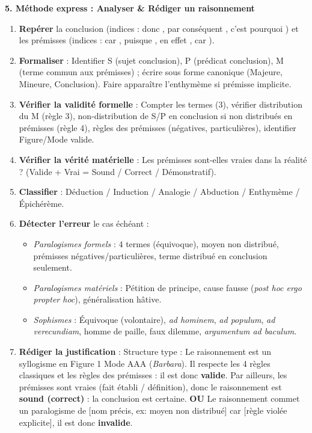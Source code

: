 \documentclass[11pt]{article}
\newcommand{\cle}[1]{{\popxbold\color{popdark}#1}}
\begin{document}
\begin{bilan}
\textbf{5. Méthode express : Analyser \& Rédiger un raisonnement}
\begin{enumerate}
  \item \textbf{Repérer} la conclusion (indices : \og donc \fg, \og par conséquent \fg, \og c'est pourquoi \fg) et les prémisses (indices : \og car \fg, \og puisque \fg, \og en effet \fg, \og car \fg).
  \item \textbf{Formaliser} : Identifier S (sujet conclusion), P (prédicat conclusion), M (terme commun aux prémisses) ; écrire sous forme canonique (Majeure, Mineure, Conclusion). Faire apparaître l'enthymème si prémisse implicite.
  \item \textbf{Vérifier la validité formelle} : Compter les termes (3), vérifier distribution du M (règle 3), non-distribution de S/P en conclusion si non distribués en prémisses (règle 4), règles des prémisses (négatives, particulières), identifier Figure/Mode valide.
  \item \textbf{Vérifier la vérité matérielle} : Les prémisses sont-elles vraies dans la réalité ? (Valide + Vrai = \cle{Sound / Correct / Démonstratif}).
  \item \textbf{Classifier} : Déduction / Induction / Analogie / Abduction / Enthymème / Épichérème.
  \item \textbf{Détecter l'erreur} le cas échéant :
  \begin{itemize}
    \item \textit{Paralogismes formels} : 4 termes (équivoque), moyen non distribué, prémisses négatives/particulières, terme distribué en conclusion seulement.
    \item \textit{Paralogismes matériels} : Pétition de principe, cause fausse (\textit{post hoc ergo propter hoc}), généralisation hâtive.
    \item \textit{Sophismes} : Équivoque (volontaire), \textit{ad hominem}, \textit{ad populum}, \textit{ad verecundiam}, homme de paille, faux dilemme, \textit{argumentum ad baculum}.
  \end{itemize}
  \item \textbf{Rédiger la justification} : Structure type : \og Le raisonnement est un syllogisme en Figure 1 Mode AAA (\textit{Barbara}). Il respecte les 4 règles classiques et les règles des prémisses : il est donc \textbf{valide}. Par ailleurs, les prémisses sont vraies (fait établi / définition), donc le raisonnement est \textbf{sound (correct)} : la conclusion est certaine. \fg \textbf{OU} \og Le raisonnement commet un paralogisme de [nom précis, ex: moyen non distribué] car [règle violée explicite], il est donc \textbf{invalide}. \fg
\end{enumerate}

\end{bilan}
\end{document}
